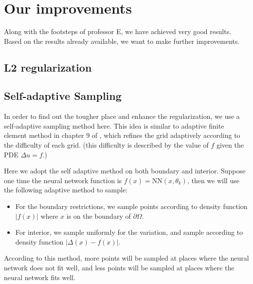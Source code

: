 \documentclass{article}
\begin{document}
\section{Our improvements}
\par Along with the footsteps of professor E, we have achieved very good results. Based on the results already available, we want to make further improvements. 

\subsection{L2 regularization}

\subsection{Self-adaptive Sampling}
\par In order to find out the tougher place and enhance the regularization, we use a self-adaptive sampling method here. This idea is similar to adaptive finite element method in chapter 9 of \cite{brenner2007mathematical}, which refines the grid adaptively according to the difficulty of each grid. (this difficulty is described by the value of $f$ given the PDE $\Delta u = f$.) 
\par Here we adopt the self adaptive method on both boundary and interior. Suppose one time the neural network function is $f(x) = \mathrm{NN}(x, \theta_k)$, then we will use the following adaptive method to sample:
\begin{itemize}
	\item For the boundary restrictions, we sample points according to density function $|f(x)|$ where $x$ is on the boundary of $\partial\Omega$.
	\item For interior, we sample uniformly for the variation, and sample according to density function $|\Delta(x) - f(x)|$.
\end{itemize}
\par  According to this method, more points will be sampled at places where the neural network does not fit well, and less points will be sampled at places where the neural network fits well. 
\end{document}
